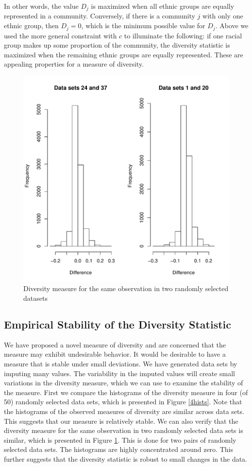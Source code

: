 \documentclass{article}
\begin{document}
In other words, the value $D_j$ is maximized when all ethnic groups are equally represented in a community.  Conversely, if there is a community $j$ with only one ethnic group, then $D_j =0$, which is the minimum possible value for $D_j$.  Above we used the more general constraint with $c$ to illuminate the following:  if one racial group makes up some proportion of the community, the diversity statistic is maximized when the remaining ethnic groups are equally represented.  These are appealing properties for a measure of diversity.

\begin{figure}[t]
\begin{center}
 \includegraphics[width = .75\textwidth]{graphics/diver2hists.pdf}
\end{center}
\caption{Diversity measure for the same observation in two randomly selected datasets \label{2hists}}
\end{figure}


\subsection{Empirical Stability of the Diversity Statistic}\label{imperstab}
We have proposed a novel measure of diversity and are concerned that the measure may exhibit undesirable behavior.  It would be desirable to have a measure that is stable under small deviations.  We have generated data sets by imputing many values.  The variability in the imputed values will create small variations in the diversity measure, which we can use to examine the stability of the measure.  First we compare the histograms of the diversity measure in four (of 50) randomly selected data sets, which is presented in Figure \ref{4hists}.  Note that the histograms of the observed measures of diversity are similar across data sets.  This suggests that our measure is relatively stable.  We can also verify that the diversity measure for the same observation in two randomly selected data sets is similar, which is presented in Figure \ref{2hists}.  This is done for two pairs of randomly selected data sets.  The histograms are highly concentrated around zero.  This further suggests that the diversity statistic is robust to small changes in the data.   
\end{document}

